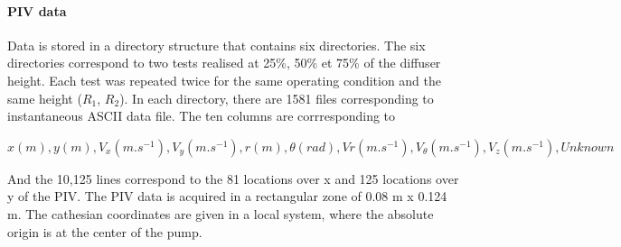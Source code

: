 \paragraph{PIV data} Data is stored in a directory structure that contains six directories.
The six directories correspond to two tests realised at 25\%, 50\% et 75\% of the diffuser height.
Each test was repeated twice for the same operating condition and the same height ($R_1$, $R_2$).
In each directory, there are 1581 files corresponding to instantaneous ASCII data file.
The ten columns are corrresponding to%

\begin{center}
    $x(m),y(m),V_x(m.s^{-1}),V_y(m.s^{-1}),r(m),\theta(rad),Vr(m.s^{-1}),V_{\theta}(m.s^{-1}),V_z(m.s^{-1}),\textit{Unknown}$
\end{center}

And the 10,125 lines correspond to the 81 locations over x and 125 locations over y of the PIV.
The PIV data is acquired in a rectangular zone of 0.08 m x 0.124 m.
The cathesian coordinates are given in a local system, where the absolute origin is at the center of the pump.


